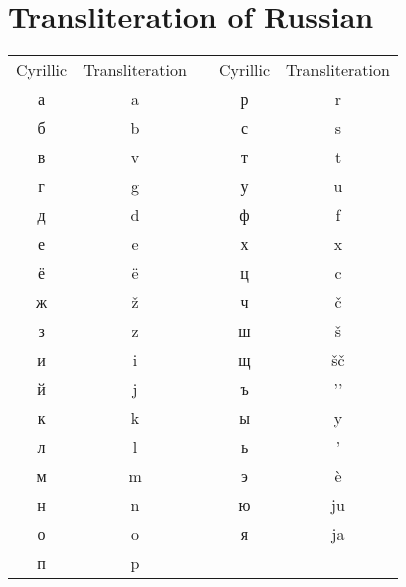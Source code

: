 \chapter*{Transliteration of Russian}




\begin{table}[H]
\renewcommand*{\arraystretch}{1.4}
\begin{tabular}{c c p{4em} c c} 
	 Cyrillic & Transliteration & & Cyrillic & Transliteration\\
	 а & a & & р & r\\
	 б & b & & с & s\\
	 в & v & & т & t\\
	 г & g & & у & u\\
	 д & d & & ф & f\\
	 е & e & & х & x\\
	 ё & ë & & ц & c\\
	 ж & ž & & ч & č\\
	 з & z & & ш & š\\
	 и & i & & щ & šč\\
	 й & j & & ъ & ’’\\
	 к & k & & ы & y\\
	 л & l & & ь & ’\\
	 м & m & & э & è\\
	 н & n & & ю & ju\\
	 о & o & & я & ja\\
	 п & p & & & \\
	\end{tabular}
\end{table}